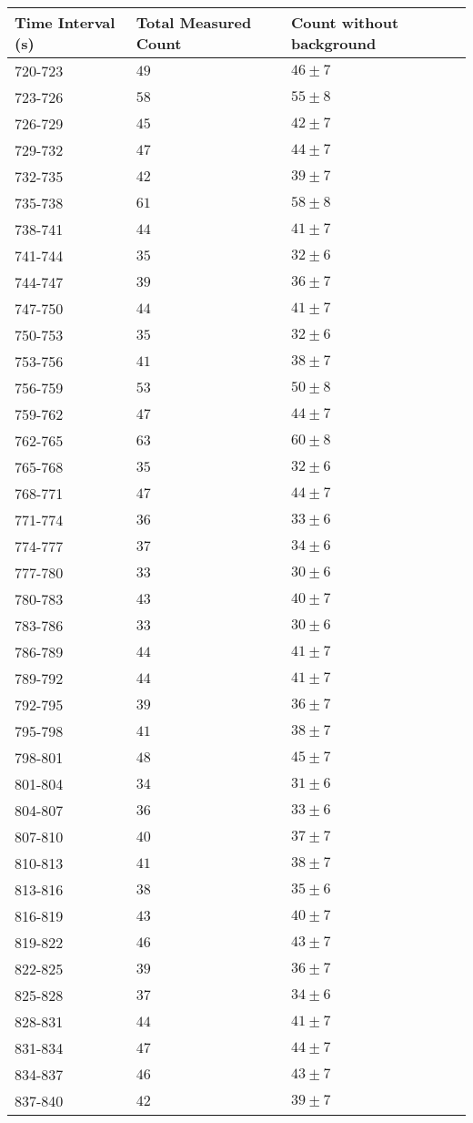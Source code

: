 \begin{tabular}{| p{} | p{} | p{} |}\hline
Time Interval (s) & Total Measured Count & Count without background\\
\hline
720-723 & $49$ & $46\pm 7$\\
723-726 & $58$ & $55\pm 8$\\
726-729 & $45$ & $42\pm 7$\\
729-732 & $47$ & $44\pm 7$\\
732-735 & $42$ & $39\pm 7$\\
735-738 & $61$ & $58\pm 8$\\
738-741 & $44$ & $41\pm 7$\\
741-744 & $35$ & $32\pm 6$\\
744-747 & $39$ & $36\pm 7$\\
747-750 & $44$ & $41\pm 7$\\
750-753 & $35$ & $32\pm 6$\\
753-756 & $41$ & $38\pm 7$\\
756-759 & $53$ & $50\pm 8$\\
759-762 & $47$ & $44\pm 7$\\
762-765 & $63$ & $60\pm 8$\\
765-768 & $35$ & $32\pm 6$\\
768-771 & $47$ & $44\pm 7$\\
771-774 & $36$ & $33\pm 6$\\
774-777 & $37$ & $34\pm 6$\\
777-780 & $33$ & $30\pm 6$\\
780-783 & $43$ & $40\pm 7$\\
783-786 & $33$ & $30\pm 6$\\
786-789 & $44$ & $41\pm 7$\\
789-792 & $44$ & $41\pm 7$\\
792-795 & $39$ & $36\pm 7$\\
795-798 & $41$ & $38\pm 7$\\
798-801 & $48$ & $45\pm 7$\\
801-804 & $34$ & $31\pm 6$\\
804-807 & $36$ & $33\pm 6$\\
807-810 & $40$ & $37\pm 7$\\
810-813 & $41$ & $38\pm 7$\\
813-816 & $38$ & $35\pm 6$\\
816-819 & $43$ & $40\pm 7$\\
819-822 & $46$ & $43\pm 7$\\
822-825 & $39$ & $36\pm 7$\\
825-828 & $37$ & $34\pm 6$\\
828-831 & $44$ & $41\pm 7$\\
831-834 & $47$ & $44\pm 7$\\
834-837 & $46$ & $43\pm 7$\\
837-840 & $42$ & $39\pm 7$\\
\hline
\end{tabular}\quad
